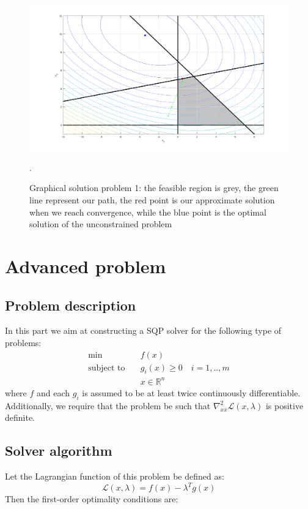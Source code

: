 \documentclass{article}
\begin{document}
\begin{figure}[H]
    \centering
    \includegraphics[width=16cm]{fig1_qp.png}
    \caption{Graphical solution problem 1: the feasible region is grey, the green line represent our path, the red point is our approximate solution when we reach convergence, while the blue point is the optimal solution of the unconstrained problem }.
\end{figure}



\newpage

\section{Advanced problem}
\subsection{Problem description}
In this part we aim at constructing a SQP solver for the following type of problems:
\begin{equation}
\begin{aligned}
\textrm{min} \quad        & f(x) \\
\textrm{subject to} \quad & g_i(x) \geq 0 \quad i = 1, .., m \\
                          & x \in \mathbb{R}^n
\end{aligned}
\label{prob:sqp}
\end{equation}
where $f$ and each $g_i$ is assumed to be at least twice continuously differentiable. Additionally, we require that the problem be such that  $\nabla^2_{xx}\mathcal{L}(x, \lambda)$ is positive definite.

\subsection{Solver algorithm}
Let the Lagrangian function of this problem be defined as:
\begin{equation*}
    \mathcal{L}(x, \lambda) = f(x) - \lambda^T g(x) 
\end{equation*}
Then the first-order optimality conditions are:
\end{document}
